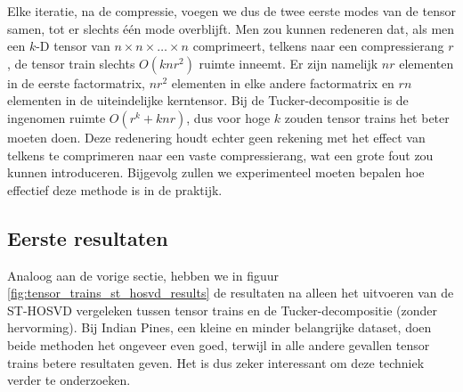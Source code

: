 Elke iteratie, na de compressie, voegen we dus de twee eerste modes van de tensor samen, tot er slechts \'e\'en mode overblijft. Men zou kunnen redeneren dat, als men een $k$-D tensor van $n \times n \times \dots \times n$ comprimeert, telkens naar een compressierang $r$, de tensor train slechts $O(knr^2)$ ruimte inneemt. Er zijn namelijk $nr$ elementen in de eerste factormatrix, $nr^2$ elementen in elke andere factormatrix en $rn$ elementen in de uiteindelijke kerntensor. Bij de Tucker-decompositie is de ingenomen ruimte $O(r^k + knr)$, dus voor hoge $k$ zouden tensor trains het beter moeten doen. Deze redenering houdt echter geen rekening met het effect van telkens te comprimeren naar een vaste compressierang, wat een grote fout zou kunnen introduceren. Bijgevolg zullen we experimenteel moeten bepalen hoe effectief deze methode is in de praktijk.

\subsection{Eerste resultaten}

Analoog aan de vorige sectie, hebben we in figuur \ref{fig:tensor_trains_st_hosvd_results} de resultaten na alleen het uitvoeren van de ST-HOSVD vergeleken tussen tensor trains en de Tucker-decompositie (zonder hervorming). Bij Indian Pines, een kleine en minder belangrijke dataset, doen beide methoden het ongeveer even goed, terwijl in alle andere gevallen tensor trains betere resultaten geven. Het is dus zeker interessant om deze techniek verder te onderzoeken.

